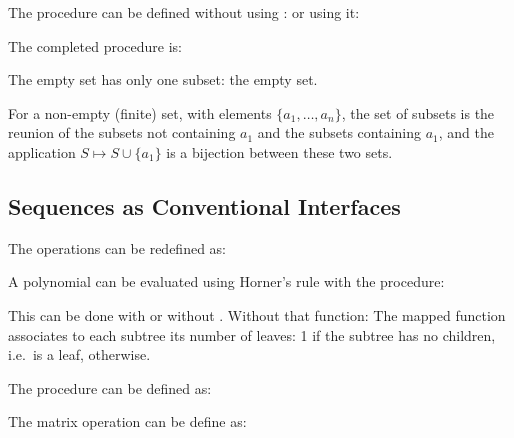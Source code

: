 \begin{exe}[2.31]
    The procedure  can be defined without using :
    or using it:
\end{exe}

\begin{exe}[2.32]
    The completed procedure is:

    The empty set has only one subset: the empty set.

    For a non-empty (finite) set, with elements $\{a_1, …, a_n\}$, the set of 
    subsets is the reunion of the subsets not containing $a_1$ and the subsets 
    containing $a_1$, and the application $S \mapsto S \cup \{a_1\}$ is 
    a bijection between these two sets.
\end{exe}

\subsection{Sequences as Conventional Interfaces}

\begin{exe}[2.33]
    The operations can be redefined as:
\end{exe}

\begin{exe}[2.34]
    A polynomial can be evaluated using Horner’s rule with the procedure:
\end{exe}

\begin{exe}[2.35]
    This can be done with or without . Without that function:
    The mapped function associates to each subtree its number of leaves: 1 if 
    the subtree has no children, i.e.\ is a leaf,  
    otherwise.
\end{exe}

\begin{exe}[2.36]
    The procedure  can be defined as:
\end{exe}

\begin{exe}[2.37]
    The matrix operation can be define as:
\end{exe}

